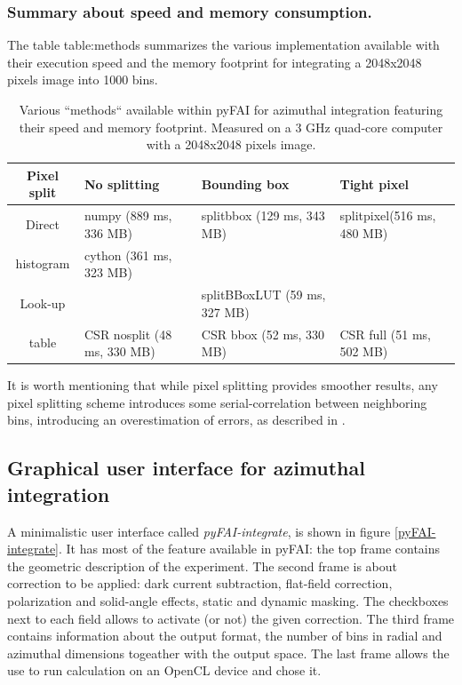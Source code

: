\documentclass[preprint]{iucr}
\begin{document}
\subsubsection{Summary about speed and memory consumption.}

The table {table:methods}  summarizes the various implementation available
with their execution speed and the memory footprint for integrating a 2048x2048
pixels image into 1000 bins.

\begin{table}
\caption{Various ``methods`` available within pyFAI for azimuthal integration
featuring their speed and memory footprint. Measured on a 3 GHz quad-core
computer with a 2048x2048 pixels image.}
\begin{tabular}[pos]{|c|l|l|l|}
\hline
Pixel split& No splitting & Bounding box & Tight pixel \\
\hline
Direct    & numpy (889 ms, 336 MB) & splitbbox (129 ms, 343 MB) &
splitpixel(516 ms, 480 MB)\\
histogram & cython (361 ms, 323 MB) &                       &                \\
\hline
Look-up   &       & splitBBoxLUT (59 ms, 327 MB) &    \\
table     & CSR nosplit (48 ms, 330 MB)       & CSR bbox (52 ms, 330
MB) & CSR full (51 ms, 502 MB)\\
\hline
\end{tabular}
\label{table:methods}
\end{table}

It is worth mentioning that while pixel splitting provides smoother results, any
pixel splitting scheme introduces some serial-correlation between
neighboring bins, introducing an overestimation of errors, as described in \cite{billinge2014}.

\subsection{Graphical user interface for azimuthal integration}

A minimalistic user interface called \textit{pyFAI-integrate}, is
shown in figure \ref{pyFAI-integrate}.
It has most of the feature available in pyFAI:
the top frame contains the geometric description of the experiment.
The second frame is about correction to be applied: dark current subtraction,
flat-field correction, polarization and solid-angle effects, static and dynamic
masking. The checkboxes next to each field allows to activate (or not) the given
correction.
The third frame contains information about the output format, the number of bins
in radial and azimuthal dimensions togeather with the output space.
The last frame allows the use to run calculation on an OpenCL device and
chose it.
\end{document}
